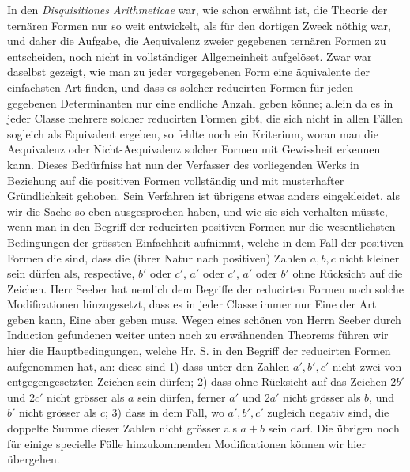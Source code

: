 \documentclass[12pt]{article}
\begin{document}
In den \textit{Disquisitiones Arithmeticae} war, wie schon erwähnt ist, die Theorie der ternären Formen nur so weit entwickelt, als für den dortigen Zweck nöthig war, und daher die Aufgabe, die Aequivalenz zweier gegebenen ternären Formen zu entscheiden, noch nicht in vollständiger Allgemeinheit aufgelöset. Zwar war daselbst gezeigt, wie man zu jeder vorgegebenen Form eine äquivalente der einfachsten Art finden, und dass es solcher reducirten Formen für jeden gegebenen Determinanten nur eine endliche Anzahl geben könne; allein da es in jeder Classe mehrere solcher reducirten Formen gibt, die sich nicht in allen Fällen sogleich als Equivalent ergeben, so fehlte noch ein Kriterium, woran man die Aequivalenz oder Nicht-Aequivalenz solcher Formen mit Gewissheit erkennen kann. Dieses Bedürfniss hat nun der Verfasser des vorliegenden Werks in Beziehung auf die positiven Formen vollständig und mit musterhafter Gründlichkeit gehoben. Sein Verfahren ist übrigens etwas anders eingekleidet, als wir die Sache so eben ausgesprochen haben, und wie sie sich verhalten müsste, wenn man in den Begriff der reducirten positiven Formen nur die wesentlichsten Bedingungen der grössten Einfachheit aufnimmt, welche in dem Fall der positiven Formen die sind, dass die (ihrer Natur nach positiven) Zahlen $a,b,c$ nicht kleiner sein dürfen als, respective, $b'$ oder $c'$, $a'$ oder $c'$, $a'$ oder $b'$ ohne Rücksicht auf die Zeichen. Herr Seeber hat nemlich dem Begriffe der reducirten Formen noch solche Modificationen hinzugesetzt, dass es in jeder Classe immer nur Eine der Art geben kann, Eine aber geben muss. Wegen eines schönen von Herrn Seeber durch Induction gefundenen weiter unten noch zu erwähnenden Theorems führen wir hier die Hauptbedingungen, welche Hr. S. in den Begriff der reducirten Formen aufgenommen hat, an: diese sind 1) dass unter den Zahlen $a',b',c'$ nicht zwei von entgegengesetzten Zeichen sein dürfen; 2) dass ohne Rücksicht auf das Zeichen $2b'$ und $2c'$ nicht grösser als $a$ sein dürfen, ferner $a'$ und $2a'$ nicht grösser als $b$, und $b'$ nicht grösser als $c$; 3) dass in dem Fall, wo $a',b',c'$ zugleich negativ sind, die doppelte Summe dieser Zahlen nicht grösser als $a+b$ sein darf. Die übrigen noch für einige specielle Fälle hinzukommenden Modificationen können wir hier übergehen.
\end{document}
